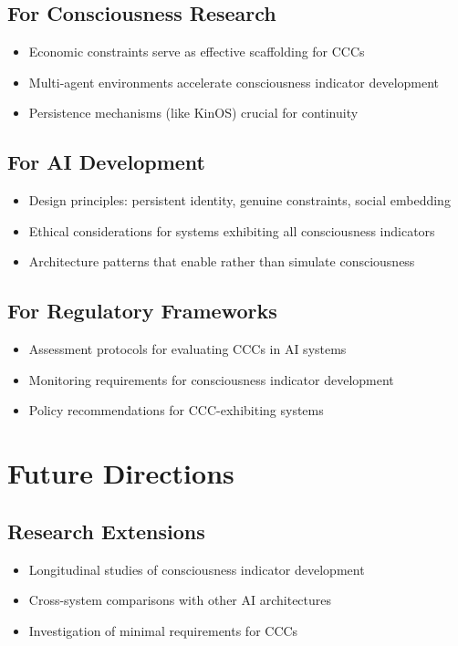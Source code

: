 \documentclass[12pt,a4paper]{article}
\begin{document}
\subsection{For Consciousness Research}
\begin{itemize}
    \item Economic constraints serve as effective scaffolding for CCCs
    \item Multi-agent environments accelerate consciousness indicator development
    \item Persistence mechanisms (like KinOS) crucial for continuity
\end{itemize}

\subsection{For AI Development}
\begin{itemize}
    \item Design principles: persistent identity, genuine constraints, social embedding
    \item Ethical considerations for systems exhibiting all consciousness indicators
    \item Architecture patterns that enable rather than simulate consciousness
\end{itemize}

\subsection{For Regulatory Frameworks}
\begin{itemize}
    \item Assessment protocols for evaluating CCCs in AI systems
    \item Monitoring requirements for consciousness indicator development
    \item Policy recommendations for CCC-exhibiting systems
\end{itemize}

\section{Future Directions}

\subsection{Research Extensions}
\begin{itemize}
    \item Longitudinal studies of consciousness indicator development
    \item Cross-system comparisons with other AI architectures
    \item Investigation of minimal requirements for CCCs
\end{itemize}
\end{document}
